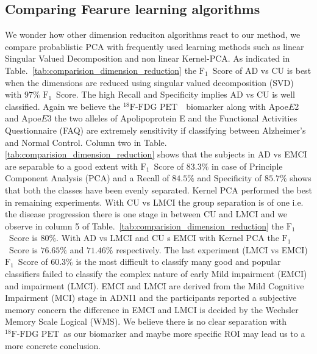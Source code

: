 \documentclass[authoryear,preprint,revi	ew,12pt]{elsarticle}
\newcommand{\acc}[1]     {$ #1 \% $}
\newcommand{\Alz} {{Alzheimer\textquoteright s} }
\newcommand{\F}   {$ \textrm{F}_1 $}
\newcommand{\FDGPET}   {$ ^{18}\textrm{F-FDG PET} $~}
\newcommand{\apoe}[1]   {Apoe$ E $#1}
\begin{document}
\subsection{Comparing Fearure learning algorithms}
\label{subsection:dim_red}
We wonder how other dimension reduciton algorithms react to our method, we compare probablistic PCA with frequently used learning methods such as linear Singular Valued Decomposition and non linear Kernel-PCA.
As indicated in Table.~\ref{tab:comparision_dimension_reduction} the \F~Score of AD vs CU is best when the dimensions are reduced using singular valued decomposition (SVD) with \acc{97} \F~Score. The high Recall and Specificity implies AD vs CU is well classified. Again we believe the \FDGPET~biomarker along with \apoe{2} and \apoe{3} the two alleles of Apolipoprotein E and the Functional Activities Questionnaire (FAQ) are extremely sensitivity if classifying between \Alz and Normal Control. 
Column two in Table.\ref{tab:comparision_dimension_reduction} shows that the subjects in AD vs EMCI are separable to a good extent with \F~Score of \acc{83.3} in case of Principle Component Analysis (PCA) and a Recall of \acc{84.5} and Specificity of \acc{85.7} shows that both the classes have been evenly separated. 
Kernel PCA \citep{mika1998kernel} performed the best in remaining experiments. With CU vs LMCI the group separation is of one i.e. the disease progression there is one stage in between CU and LMCI and we observe in column 5 of Table.~\ref{tab:comparision_dimension_reduction} the \F~Score is \acc{80}. With AD vs LMCI and CU s EMCI with Kernel PCA the \F~Score is \acc{76.65} and \acc{71.46} respectively. The last experiment (LMCI vs EMCI) \F~Score of \acc{60.3} is the most difficult to classify many good and popular classifiers failed to classify the complex nature of early Mild impairment (EMCI) and impairment (LMCI). EMCI and LMCI are derived from the Mild Cognitive Impairment (MCI) stage in ADNI1 and the participants reported a subjective memory concern the difference in EMCI and LMCI is decided by the Wechsler Memory Scale Logical (WMS). We believe there is no clear separation with \FDGPET as our biomarker and maybe more specific ROI may lead us to a more concrete conclusion. 
\end{document}

